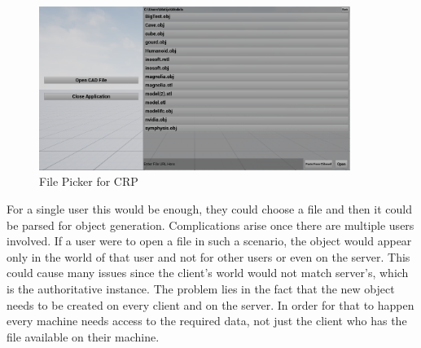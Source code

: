 \begin{figure}[htpb]
	\centering
	\includegraphics[width=0.9\textwidth]{fig/FilePicker2.png}
	\caption[CAD Runtime Presenter File Picker]{File Picker for CRP\protect}
	\label{fig:FilePicker}
\end{figure}

For a single user this would be enough, they could choose a file and then it could be parsed for object generation. Complications arise once there are multiple users involved. If a user were to open a file in such a scenario, the object would appear only in the world of that user and not for other users or even on the server. This could cause many issues since the client's world would not match server's, which is the authoritative instance. The problem lies in the fact that the new object needs to be created on every client and on the server. In order for that to happen every machine needs access to the required data, not just the client who has the file available on their machine.\\

